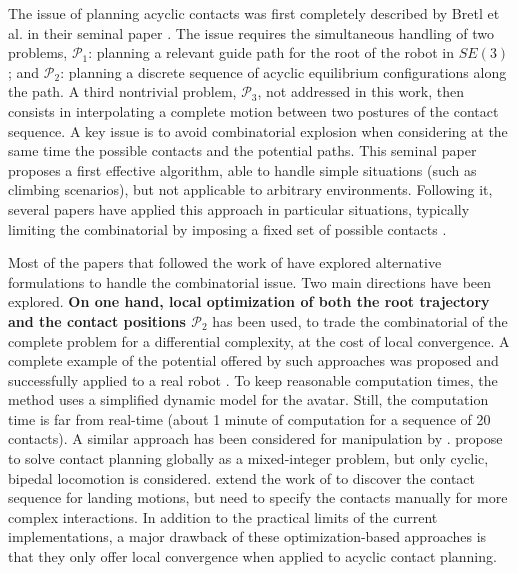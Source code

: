 The issue of planning acyclic contacts was first completely described by Bretl et al. in their seminal paper  \citep{Bretl:2006:MPM:1124573.1124585}. The issue requires the simultaneous handling of two problems, $\mathcal{P}_1$: planning a relevant guide path for the root of the robot in $SE(3)$; and $\mathcal{P}_2$: planning a discrete sequence of acyclic equilibrium configurations along the path. A third nontrivial problem, $\mathcal{P}_3$, not addressed in this work, then consists in interpolating a complete motion between two postures of the contact sequence.  A key issue is to avoid combinatorial explosion when considering at the same time the possible contacts and the potential paths. This seminal paper proposes a first effective algorithm, able to handle simple situations (such as climbing scenarios), but not applicable to arbitrary environments. Following it, seve\-ral papers have applied this approach in particular situations, typically limiting the combinatorial by imposing a fixed set of possible contacts \citep{Hauser06usingmotion, stilman2010}.

Most of the papers that followed the work of \citeauthor{Bretl:2006:MPM:1124573.1124585} have explored alternative formulations to handle the combinatorial issue. Two main directions have been explored. \textbf{On one hand, local optimization of both the root trajectory \Pa and the contact positions $\mathcal{P}_2$} has been used, to trade the combinatorial of the complete problem for a differential complexity, at the cost of local convergence. A complete example of the potential offered by such approaches was proposed \citep{Mordatch:2012:DCB:2185520.2185539} and successfully applied to a real robot \citep{mordatch2015}. To keep reasonable computation times, the method uses a simplified dynamic model for the avatar. Still, the computation time is far from real-time  (about 1 minute of computation for a sequence of 20 contacts).  A similar approach has been considered for manipulation by \cite{gabicciniisrr15}. \citeauthor{DBLP:conf/humanoids/DeitsT14} propose to solve contact planning globally as a mixed-integer problem, but only cyclic, bipedal locomotion is considered. 
\citeauthor{dai2014whole} extend the work of \citeauthor{Posa:2014:DMT:2568343.2568352} to discover the contact sequence for landing motions, but need to specify
the contacts manually for more complex interactions.
In addition to the practical limits of the current implementations, a major drawback of these optimization-based approaches is that they only offer local convergence when applied to acyclic contact planning.

